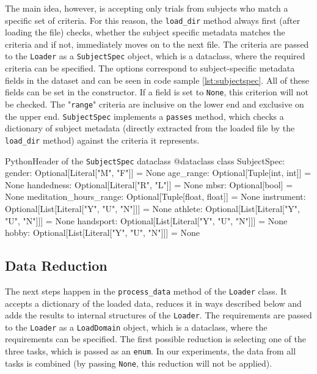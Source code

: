 \documentclass[english, he, bc, kiv, iso690alph]{fasthesis}
\begin{document}
The main idea, however, is accepting only trials from subjects who match a specific set of criteria. For this reason, the \texttt{load\_dir} method always first (after loading the file) checks, whether the subject specific metadata matches the criteria and if not, immediately moves on to the next file. The criteria are passed to the \texttt{Loader} as a \texttt{SubjectSpec} object, which is a dataclass, where the required criteria can be specified. The options correspond to subject-specific metadata fields in the dataset and can be seen in code sample \ref{lst:subjectspec}. All of these fields can be set in the constructor. If a field is set to \texttt{None}, this criterion will not be checked. The "\texttt{range}" criteria are inclusive on the lower end and exclusive on the upper end. \texttt{SubjectSpec} implements a \texttt{passes} method, which checks a dictionary of subject metadata (directly extracted from the loaded file by the \texttt{load\_dir} method) against the criteria it represents.

\begin{code}{Python}{Header of the \texttt{SubjectSpec} dataclass\label{lst:subjectspec}}
	@dataclass
	class SubjectSpec:
	gender: Optional[Literal["M", "F"]] = None
	age_range: Optional[Tuple[int, int]] = None
	handedness: Optional[Literal["R", "L"]] = None
	mbsr: Optional[bool] = None
	meditation_hours_range: Optional[Tuple[float, float]] = None
	instrument: Optional[List[Literal["Y", "U", "N"]]] = None
	athlete: Optional[List[Literal["Y", "U", "N"]]] = None
	handsport: Optional[List[Literal["Y", "U", "N"]]] = None
	hobby: Optional[List[Literal["Y", "U", "N"]]] = None
\end{code}

\subsection{Data Reduction}

The next steps happen in the \texttt{process\_data} method of the \texttt{Loader} class. It accepts a dictionary of the loaded data, reduces it in ways described below and adds the results to internal structures of the \texttt{Loader}. The requirements are passed to the \texttt{Loader} as a \texttt{LoadDomain} object, which is a dataclass, where the requirements can be specified. The first possible reduction is selecting one of the three tasks, which is passed as an \texttt{enum}. In our experiments, the data from all tasks is combined (by passing \texttt{None}, this reduction will not be applied).
\end{document}
